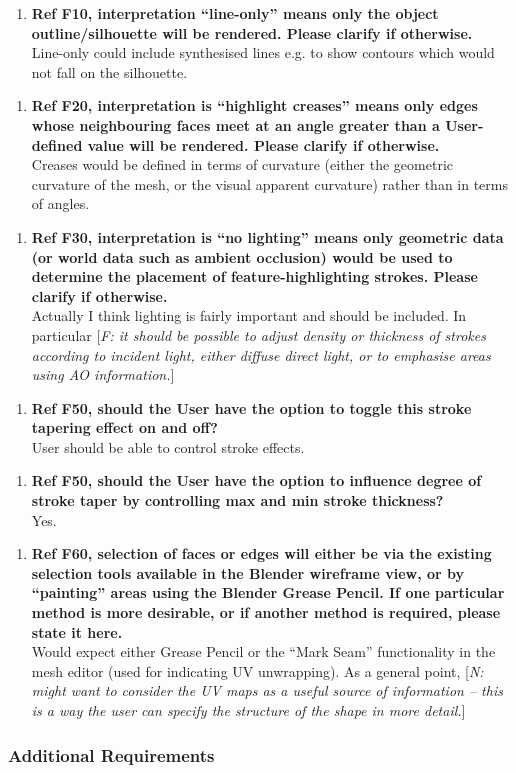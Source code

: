 \documentclass[a4paper,10pt]{article}
\newcommand{\freq}[1]{
    [\textit{F\arabic{fReqNum}: #1}]%
    \addtocounter{fReqNum}{10}%
}
\newcommand{\nreq}[1]{
    [\textit{N\arabic{nReqNum}: #1}]%
    \addtocounter{nReqNum}{10}%
}
\newcommand{\Qq}[1]{\textbf{#1}}
\newcommand{\Qitemclar}[2][]{
\begin{enumerate}[topsep=2pt,leftmargin=2.8em]
\item[\textit{C\arabic{clarNum}#1.}] #2
\addtocounter{clarNum}{10}
\end{enumerate}
}
\begin{document}
\Qitemclar{\Qq{Ref F10, interpretation ``line-only'' means only the object outline/silhouette will be rendered. Please clarify if otherwise.} \\ 
Line-only could include synthesised lines e.g. to show contours which would not fall on the silhouette.
}
\Qitemclar{\Qq{Ref F20, interpretation is ``highlight creases'' means only edges whose neighbouring faces meet at an angle greater than a User-defined value will be rendered. Please clarify if otherwise.} \\
Creases would be defined in terms of curvature (either the geometric curvature of the mesh, or the visual apparent curvature) rather than in terms of angles.
}
\Qitemclar{\Qq{Ref F30, interpretation is ``no lighting'' means only geometric data (or world data such as ambient occlusion) would be used to determine the placement of feature-highlighting strokes. Please clarify if otherwise.} \\
Actually I think lighting is fairly important and should be included. 
In particular \freq{it should be possible to adjust density or thickness of strokes according to incident light, either diffuse direct light, or to emphasise areas using AO information.}
}
\Qitemclar{\Qq{Ref F50, should the User have the option to toggle this stroke tapering effect on and off?} \\
User should be able to control stroke effects.
}
\Qitemclar{\Qq{Ref F50, should the User have the option to influence degree of stroke taper by controlling max and min stroke thickness?} \\
Yes.
}
\Qitemclar{\Qq{Ref F60, selection of faces or edges will either be via the existing selection tools available in the Blender wireframe view, or by ``painting'' areas using the Blender Grease Pencil. If one particular method is more desirable, or if another method is required, please state it here.} \\
Would expect either Grease Pencil or the “Mark Seam” functionality in the mesh editor (used for indicating UV unwrapping). 
As a general point, \nreq{might want to consider the UV maps as a useful source of information – this is a way the user can specify the structure of the shape in more detail.}
}

\subsubsection{Additional Requirements}
\end{document}
